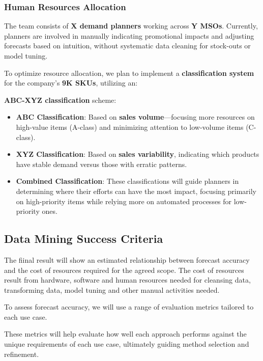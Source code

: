 \documentclass[
  american,
  10,
  a4paper,
]{book}
\providecommand{\tightlist}{%
  \setlength{\itemsep}{0pt}\setlength{\parskip}{0pt}}
\theoremstyle{definition}
\theoremstyle{remark}
\begin{document}
\subsubsection{\texorpdfstring{\textbf{Human Resources
Allocation}}{Human Resources Allocation}}\label{human-resources-allocation}

The team consists of \textbf{X demand planners} working across \textbf{Y
MSOs}. Currently, planners are involved in manually indicating
promotional impacts and adjusting forecasts based on intuition, without
systematic data cleaning for stock-outs or model tuning.

To optimize resource allocation, we plan to implement a
\textbf{classification system} for the company's \textbf{9K SKUs},
utilizing an:

\textbf{ABC-XYZ classification} scheme:

\begin{itemize}
\tightlist
\item
  \textbf{ABC Classification}: Based on \textbf{sales volume}---focusing
  more resources on high-value items (A-class) and minimizing attention
  to low-volume items (C-class).
\item
  \textbf{XYZ Classification}: Based on \textbf{sales variability},
  indicating which products have stable demand versus those with erratic
  patterns.
\item
  \textbf{Combined Classification}: These classifications will guide
  planners in determining where their efforts can have the most impact,
  focusing primarily on high-priority items while relying more on
  automated processes for low-priority ones.
\end{itemize}

\subsection{Data Mining Success
Criteria}\label{data-mining-success-criteria}

The fiinal result will show an estimated relationship between forecast
accuracy and the cost of resources required for the agreed scope. The
cost of resources result from hardware, software and human resources
needed for cleansing data, transforming data, model tuning and other
manual activities needed.

To assess forecast accuracy, we will use a range of evaluation metrics
tailored to each use case.

These metrics will help evaluate how well each approach performs against
the unique requirements of each use case, ultimately guiding method
selection and refinement.
\end{document}
